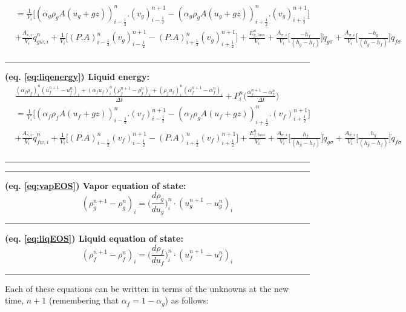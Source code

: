 \documentclass[11pt,letterpaper,titlepage]{article}
\newcommand{\half}{\frac{1}{2}}
\begin{document}
\begin{landscape}
\begin{equation*}
\begin{aligned}
&=\frac{1}{V_i}\biggr[ (\alpha_g\rho_g A(u_g+gz))_{i-\half}^n.(v_g)_{i-\half}^{n+1} - (\alpha_g\rho_g A(u_g+gz))_{i+\half}^n.(v_g)_{i+\half}^{n+1} \biggr] \\
&+\frac{A_{s,i}}{V_i}\dot{q}_{gw,i}^n + \frac{1}{V_i}\biggr[   (P.A)_{i-\half}^n(v_g)_{i-\half}^{n+1} - (P.A)_{i+\half}^n(v_g)_{i+\half}^{n+1}   \biggr] + \frac{E_{g,loss}^n}{V_i}
+\frac{A_{\sigma,i}}{V_i} \biggr[\frac{- h_f  }{(h_g-h_f)}  \biggr]\dot{q}_{g\sigma}
+\frac{A_{\sigma,i}}{V_i} \biggr[\frac{ - h_g }{(h_g-h_f)}  \biggr]\dot{q}_{f\sigma}\\
\end{aligned}
\end{equation*}
\noindent\rule{9in}{0.4pt}
\textbf{(eq. \ref{eq:liqenergy}) Liquid energy:}
\begin{equation*}
\begin{aligned}
&\frac{(\alpha_f\rho_f)_i^n (u_f^{n+1}-u_f^{n})_i+(\alpha_f u_f)_i^n   (\rho_f^{n+1} - \rho_f^n)_i+(\rho_f u_f)_i^n     (\alpha_f^{n+1}-\alpha_f^n)_i}{\Delta t} + P_i^n \biggr( \frac{\alpha_f^{n+1}-\alpha_f^n}{\Delta t} \biggr)\\
&=\frac{1}{V_i}\biggr[ (\alpha_f\rho_f A(u_f+gz))_{i-\half}^n.(v_f)_{i-\half}^{n+1} - (\alpha_f\rho_g A(u_f+gz))_{i+\half}^n.(v_f)_{i+\half}^{n+1} \biggr] \\
&+\frac{A_{s,i}}{V_i}\dot{q}_{fw,i}^n + \frac{1}{V_i}\biggr[   (P.A)_{i-\half}^n(v_f)_{i-\half}^{n+1} - (P.A)_{i+\half}^n(v_f)_{i+\half}^{n+1}   \biggr] + \frac{E_{f,loss}^n}{V_i}
+\frac{A_{\sigma,i}}{V_i} \biggr[\frac{ h_f  }{(h_g-h_f)}  \biggr]\dot{q}_{g\sigma}
+\frac{A_{\sigma,i}}{V_i} \biggr[\frac{ h_g }{(h_g-h_f)}  \biggr]\dot{q}_{f\sigma}\\
\end{aligned}
\end{equation*}
\noindent\rule{9in}{0.4pt}
\newpage
\noindent\rule{9in}{0.4pt}
\textbf{(eq. \ref{eq:vapEOS}) Vapor equation of state:}
\begin{equation*} 
(\rho_{g}^{n+1} - \rho_{g}^{n})_i= \biggr( \frac{d\rho_g}{du_g} \biggr)_i^n \cdot (u_{g}^{n+1} - u_{g}^{n})_i
\end{equation*}
\noindent\rule{9in}{0.4pt}
\textbf{(eq. \ref{eq:liqEOS}) Liquid equation of state:}
\begin{equation*} 
(\rho_{f}^{n+1} - \rho_{f}^{n})_i= \biggr( \frac{d\rho_f}{du_f} \biggr)_i^n \cdot (u_{f}^{n+1} - u_{f}^{n})_i
\end{equation*}
\noindent\rule{9in}{0.4pt}
\newline
\newline
Each of these equations can be written in terms of the unknowns at the new time, $n+1$ (remembering that $\alpha_f=1-\alpha_g$) as follows:


\end{landscape}
\end{document}
